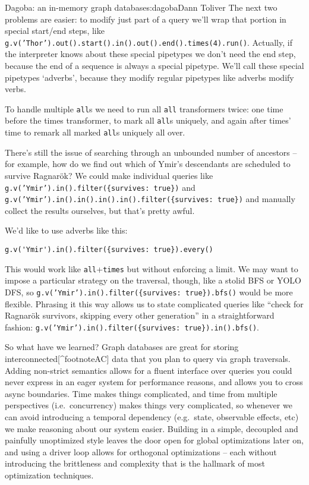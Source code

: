 \begin{aosachapter}{Dagoba: an in-memory graph database}{s:dagoba}{Dann Toliver}
The next two problems are easier: to modify just part of a query we'll
wrap that portion in special start/end steps, like
\texttt{g.v('Thor').out().start().in().out().end().times(4).run()}.
Actually, if the interpreter knows about these special pipetypes we
don't need the end step, because the end of a sequence is always a
special pipetype. We'll call these special pipetypes `adverbs', because
they modify regular pipetypes like adverbs modify verbs.

To handle multiple \texttt{all}s we need to run all \texttt{all}
transformers twice: one time before the times transformer, to mark all
\texttt{all}s uniquely, and again after times' time to remark all marked
\texttt{all}s uniquely all over.

There's still the issue of searching through an unbounded number of
ancestors -- for example, how do we find out which of Ymir's descendants
are scheduled to survive Ragnarök? We could make individual queries like
\texttt{g.v('Ymir').in().filter(\{survives: true\})} and
\newline \texttt{g.v('Ymir').in().in().in().in().filter(\{survives: true\})}
and manually collect the results ourselves, but that's pretty awful.

We'd like to use adverbs like this:

\begin{verbatim}
g.v('Ymir').in().filter({survives: true}).every()
\end{verbatim}

This would work like \texttt{all}+\texttt{times} but without enforcing a
limit. We may want to impose a particular strategy on the traversal,
though, like a stolid BFS or YOLO DFS, so
\newline \texttt{g.v('Ymir').in().filter(\{survives: true\}).bfs()}
would be more flexible. Phrasing it this way allows us to state
complicated queries like ``check for Ragnarök survivors, skipping every
other generation'' in a straightforward fashion:
\texttt{g.v('Ymir').in().filter(\{survives: true\}).in().bfs()}.

\label{wrapping-up}

So what have we learned? Graph databases are great for storing
interconnected{[}\^{}footnoteAC{]} data that you plan to query via graph
traversals. Adding non-strict semantics allows for a fluent interface
over queries you could never express in an eager system for performance
reasons, and allows you to cross async boundaries. Time makes things
complicated, and time from multiple perspectives (i.e.~concurrency)
makes things very complicated, so whenever we can avoid introducing a
temporal dependency (e.g.~state, observable effects, etc) we make
reasoning about our system easier. Building in a simple, decoupled and
painfully unoptimized style leaves the door open for global
optimizations later on, and using a driver loop allows for orthogonal
optimizations -- each without introducing the brittleness and complexity
that is the hallmark of most optimization techniques.


\end{aosachapter}
